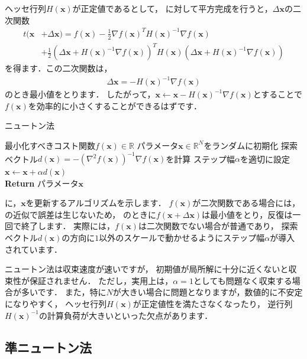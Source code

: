 ヘッセ行列$H(\bm{x})$が正定値であるとして，
に対して平方完成を行うと，$\Delta\bm{x}$の二次関数
\begin{align}
t(\bm{x} &+ \Delta\bm{x}) 
= f(\bm{x}) - \frac{1}{2} \nabla f(\bm{x})^T H(\bm{x})^{-1} \nabla f(\bm{x}) 
\nonumber\\
&+ \frac{1}{2} \left(\Delta\bm{x} + H(\bm{x})^{-1} 
\nabla f(\bm{x})\right)^T H(\bm{x}) \left(\Delta\bm{x} + H(\bm{x})^{-1} \nabla f(\bm{x})\right)
\end{align}
を得ます．この二次関数は，
\begin{align}
 \Delta\bm{x} = - H(\bm{x})^{-1} \nabla f(\bm{x})
 \label{eq:xi_h_n}
\end{align}
のとき最小値をとります．
したがって，$\bm{x} \gets \bm{x} - H(\bm{x})^{-1} \nabla f(\bm{x})$とすることで
$f(\bm{x})$を効率的に小さくすることができるはずです．

\begin{algobox}{ニュートン法}
\label{algo:newton}
\begin{algorithmic}[1]
\Require 最小化すべきコスト関数$f(\bm{x}) \in \mathbb{R}$
\State パラメータ$\bm{x} \in \mathbb{R}^N$をランダムに初期化
\State 探索ベクトル$d(\bm{x}) = - \left(\nabla^2 f(\bm{x})\right)^{-1} \nabla f(\bm{x})$を計算
\State ステップ幅$\alpha$を適切に設定
\State $\bm{x} \gets \bm{x} + \alpha d(\bm{x})$
\EndWhile\\
{\bf Return} パラメータ$\bm{x}$
\end{algorithmic}
\end{algobox}

に，$\bm{x}$を更新するアルゴリズムを示します．
$f(\bm{x})$が二次関数である場合には，の近似で誤差は生じないため，
のときに$f(\bm{x} + \Delta\bm{x})$は最小値をとり，反復は一回で終了します．
実際には，$f(\bm{x})$は二次関数でない場合が普通であり，
探索ベクトル$d(\bm{x})$の方向に$1$以外のスケールで動かせるようにステップ幅$\alpha$が導入されています．

ニュートン法は収束速度が速いですが，
初期値が局所解に十分に近くないと収束性が保証されません．
ただし，実用上は，$\alpha=1$としても問題なく収束する場合が多いです．
また，特に$N$が大きい場合に問題となりますが，数値的に不安定になりやすく，
ヘッセ行列$H(\bm{x})$が正定値性を満たさなくなったり，
逆行列$H(\bm{x})^{-1}$の計算負荷が大きいといった欠点があります．

\subsection{準ニュートン法}
\label{sec:quasi_newton}

